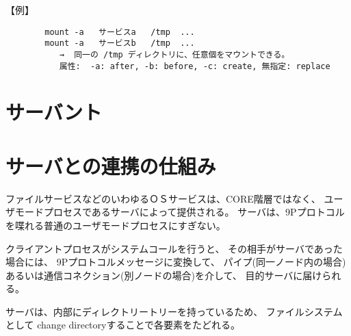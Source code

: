 {{\small
【例】\\
\begin{verbatim}
        mount -a   サービスa   /tmp  ...
        mount -a   サービスb   /tmp  ...
           →  同一の /tmp ディレクトリに、任意個をマウントできる。
           属性:  -a: after, -b: before, -c: create, 無指定: replace 
\end{verbatim}
}



\begin{comment}
{\bf\flushleft  (5) CORE階層内のmalloc()メモリ割り付け}

 現内容は仮処理であり、メモリプール域としてプロセス内に固定領域を用意している。
    これは、{\tt Pager}を作り直す際に、本格版に作り直す。\\

 【主要ソース】 {\tt alloc.c xalloc-l4.c  (in src/9/port)} \\ 

{\bf\flushleft  (6) 低レベルルーチン}

     L4 や マシンとやり取りするための低レベルルーチン類。\\

【主要ソース】 \verb|src/9/pc/_relief-l4.c|   \\
\end{comment}


\section{サーバント}


\vspace{5cm}



\section{サーバとの連携の仕組み}

  ファイルサービスなどのいわゆるＯＳサービスは、CORE階層ではなく、
ユーザモードプロセスであるサーバによって提供される。
サーバは、9Pプロトコルを喋れる普通のユーザモードプロセスにすぎない。

クライアントプロセスがシステムコールを行うと、
その相手がサーバであった場合には、
   9Pプロトコルメッセージに変換して、
   パイプ(同一ノード内の場合)あるいは通信コネクション(別ノードの場合)を介して、
目的サーバに届けられる。

 サーバは、内部にディレクトリートリーを持っているため、
 ファイルシステムとして change directoryすることで各要素をたどれる。


}
